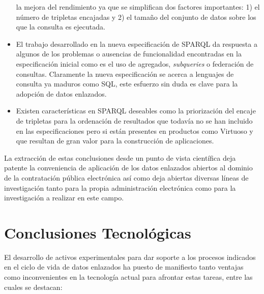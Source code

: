 \begin{itemize}
la mejora del rendimiento ya que se simplifican dos factores importantes: 1) el número de tripletas encajadas y 2) el 
tamaño del conjunto de datos sobre los que la consulta es ejecutada.
\item El trabajo desarrollado en la nueva especificación de SPARQL da respuesta a algunos de los problemas o ausencias de funcionalidad encontradas 
en la especificación inicial como es el uso de agregados, \textit{subqueries} o federación de consultas. Claramente la nueva especificación 
se acerca a lenguajes de consulta ya maduros como \gls{SQL}, este esfuerzo sin duda es clave para la adopción de datos enlazados.
\item Existen características en SPARQL deseables como la priorización del encaje de tripletas para la ordenación de resultados 
que todavía no se han incluido en las especificaciones pero si están presentes en productos como Virtuoso y que resultan 
de gran valor para la construcción de aplicaciones.
\end{itemize}

La extracción de estas conclusiones desde un punto de vista científica deja patente la conveniencia de aplicación de los datos enlazados 
abiertos al dominio de la contratación pública electrónica así como deja abiertas diversas líneas de investigación tanto para la 
propia administración electrónica como para la investigación a realizar en este campo.

\section{Conclusiones Tecnológicas}
El desarrollo de activos experimentales para dar soporte a los procesos indicados en el ciclo de vida de datos enlazados 
ha puesto de manifiesto tanto ventajas como inconvenientes en la tecnología actual para afrontar estas tareas, entre las cuales 
se destacan:

